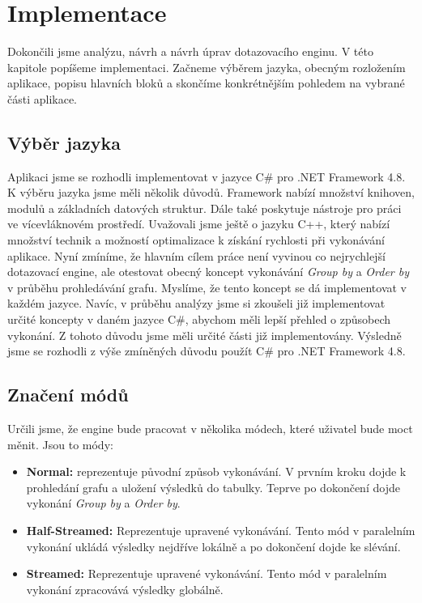 \chapter{Implementace}
\label{impl}
   
Dokončili jsme analýzu, návrh a návrh úprav dotazovacího enginu.
V této kapitole popíšeme implementaci.
Začneme výběrem jazyka, obecným rozložením aplikace, popisu hlavních bloků a skončíme konkrétnějším pohledem na vybrané části aplikace.

\section{Výběr jazyka}

Aplikaci jsme se rozhodli implementovat v jazyce C\# pro .NET Framework 4.8.
K výběru jazyka jsme měli několik důvodů.
Framework nabízí množství knihoven, modulů a základních datových struktur.
Dále také poskytuje nástroje pro práci ve vícevláknovém prostředí.
Uvažovali jsme ještě o jazyku C++, který nabízí množství technik a možností optimalizace k získání rychlosti při vykonávání aplikace. 
Nyní zmíníme, že hlavním cílem práce není vyvinou co nejrychlejší dotazovací engine, ale otestovat obecný koncept vykonávání \textit{Group by} a \textit{Order by} v průběhu prohledávání grafu.
Myslíme, že tento koncept se dá implementovat v každém jazyce.
Navíc, v průběhu analýzy jsme si zkoušeli již implementovat určité koncepty v daném jazyce C\#, abychom měli lepší přehled o způsobech vykonání.
Z tohoto důvodu jsme měli určité části již implementovány.
Výsledně jsme se rozhodli z výše zmíněných důvodu použít C\# pro .NET Framework 4.8.

\section{Značení módů} \label{impl.engine.modes}

Určili jsme, že engine bude pracovat v několika módech, které uživatel bude moct měnit.
Jsou to módy:

\begin{itemize}

\item \textbf{Normal:} reprezentuje původní způsob vykonávání.
V prvním kroku dojde k prohledání grafu a uložení výsledků do tabulky.
Teprve po dokončení dojde vykonání \textit{Group by} a \textit{Order by}.

\item \textbf{Half-Streamed:} Reprezentuje upravené vykonávání. 
Tento mód v paralelním vykonání ukládá výsledky nejdříve lokálně a po dokončení dojde ke slévání.

\item \textbf{Streamed:} Reprezentuje upravené vykonávání. 
Tento mód v paralelním vykonání zpracovává výsledky globálně.
\end{itemize}

